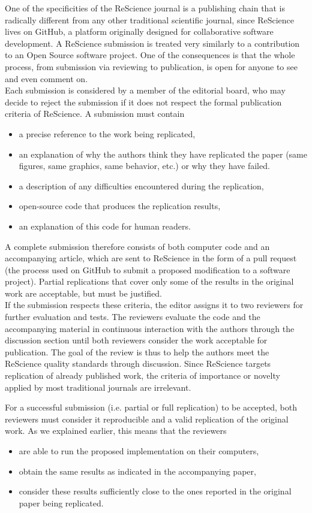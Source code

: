\documentclass[a4paper,10pt, twocolumn]{article}
\begin{document}
One of the specificities of the ReScience journal is a publishing
chain that is radically different from any other traditional
scientific journal, since ReScience lives on GitHub, a platform
originally designed for collaborative software development. A
ReScience submission is treated very similarly to a contribution to an
Open Source software project. One of the consequences is that the
whole process, from submission via reviewing
to publication, is open for anyone to see and even comment on.\\

Each submission is considered by a member of the editorial board, who
may decide to reject the submission if it does not respect the formal
publication criteria of ReScience. A submission must contain
\begin{itemize}
\item a precise reference to the work being replicated,
\item an explanation of why the authors think they have replicated the paper
  (same figures, same graphics, same behavior, etc.) or why they have failed.
\item a description of any difficulties encountered during the
      replication,
\item open-source code that produces the replication results,
\item an explanation of this code for human readers.
\end{itemize}
A complete submission therefore consists of both computer code and an
accompanying article, which are sent to ReScience in the form of a pull
request (the process used on GitHub to submit a proposed modification
to a software project).
%
Partial replications that cover only some of the results in the
original work are acceptable, but must be justified.\\

If the submission respects these criteria, the editor assigns it to
two reviewers for further evaluation and tests. The reviewers evaluate
the code and the accompanying material in continuous interaction with
the authors through the discussion section until both reviewers
consider the work acceptable for publication. The goal of the review
is thus to help the authors meet the ReScience quality standards
through discussion. Since ReScience targets replication of already
published work, the criteria of importance or novelty applied by most
traditional journals are irrelevant.

For a successful submission (i.e. partial or full replication) to be accepted,
both reviewers must consider it reproducible and a valid replication of the
original work. As we explained earlier, this means that the reviewers
\begin{itemize}
\item are able to run the proposed implementation on their computers,
\item obtain the same results as indicated in the accompanying paper,
\item consider these results sufficiently close to the ones reported in the
  original paper being replicated.
\end{itemize}
\end{document}
